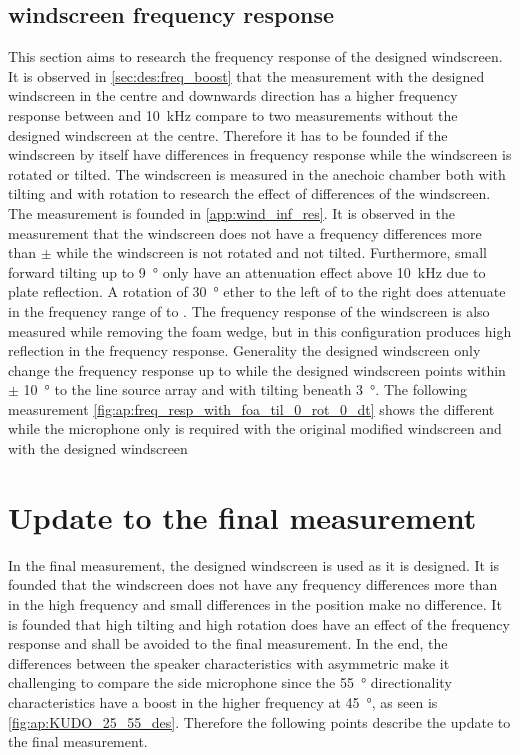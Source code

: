 \subsection{windscreen frequency response}\label{sec:ds:wind_freq_res}
This section aims to research the frequency response of the designed windscreen. It is observed in \autoref{sec:des:freq_boost} that the measurement with the designed windscreen in the centre and downwards direction has a higher frequency response between  and \SI{10}{\kilo\hertz} compare to two measurements without the designed windscreen at the centre. Therefore it has to be founded if the windscreen by itself have differences in frequency response while the windscreen is rotated or tilted. The windscreen is measured in the anechoic chamber both with tilting and with rotation to research the effect of differences of the windscreen. The measurement is founded in \autoref{app:wind_inf_res}. It is observed in the measurement that the windscreen does not have a frequency differences more than $\pm$ while the windscreen is not rotated and not tilted. Furthermore, small forward tilting up to \SI{9}{\degree} only have an attenuation effect above \SI{10}{\kilo\hertz} due to plate reflection. A rotation of \SI{30}{\degree} ether to the left of to the right does attenuate in the frequency range of  to . The frequency response of the windscreen is also measured while removing the foam wedge, but in this configuration produces high reflection in the frequency response. Generality the designed windscreen only change the frequency response up to  while the designed windscreen points within $\pm$ \SI{10}{\degree} to the line source array and with tilting beneath \SI{3}{\degree}. The following measurement \autoref{fig:ap:freq_resp_with_foa_til_0_rot_0_dt} shows the different while the microphone only is required with the original modified windscreen and with the designed windscreen





\section{Update to the final measurement}
In the final measurement, the designed windscreen is used as it is designed. It is founded that the windscreen does not have any frequency differences more than  in the high frequency and small differences in the position make no difference. It is founded that high tilting and high rotation does have an effect of the frequency response and shall be avoided to the final measurement. In the end, the differences between the speaker characteristics with asymmetric make it challenging to compare the side microphone since the \SI{55}{\degree} directionality characteristics have a boost in the higher frequency at \SI{45}{\degree}, as seen is \autoref{fig:ap:KUDO_25_55_des}. Therefore the following points describe the update to the final measurement.

